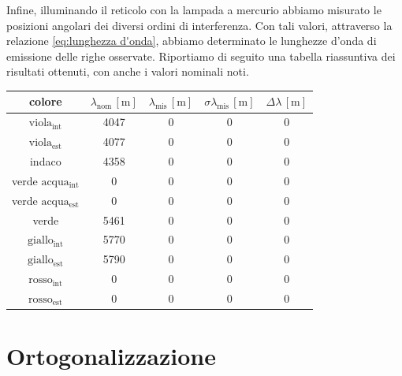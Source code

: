 \documentclass{article}
\begin{document}
        Infine, illuminando il reticolo con la lampada a mercurio abbiamo misurato le posizioni angolari dei diversi ordini di interferenza. 
        Con tali valori, attraverso la relazione \ref{eq:lunghezza d'onda}, abbiamo determinato le lunghezze d'onda di emissione delle righe osservate. 
        Riportiamo di seguito una tabella riassuntiva dei risultati ottenuti, con anche i valori nominali noti. \\  

        \begin{table}[H]
            \centering
            \begin{tabular}{|c|c|c|c|c|}
                \toprule 
                colore & 
                $ \lambda_{\mathrm{nom}} \, \mathrm{[m]} $ & 
                $ \lambda_{\mathrm{mis}} \, \mathrm{[m]} $ & 
                $ \sigma \lambda_{\mathrm{mis}} \, \mathrm{[m]}$ & 
                $ \Delta \lambda \, \mathrm{[m]} $ \\

                \midrule
                $ \mathrm{viola_{int}} $        & 4047 & 0 & 0 & 0 \\
                $ \mathrm{viola_{est}} $        & 4077 & 0 & 0 & 0 \\
                indaco                          & 4358 & 0 & 0 & 0 \\
                verde $ \mathrm{acqua_{int}} $  & 0 & 0 & 0 & 0 \\  
                verde $ \mathrm{acqua_{est}} $  & 0 & 0 & 0 & 0 \\
                verde                           & 5461 & 0 & 0 & 0 \\
                $ \mathrm{giallo_{int}} $       & 5770 & 0 & 0 & 0 \\
                $ \mathrm{giallo_{est}} $       & 5790 & 0 & 0 & 0 \\
                $ \mathrm{rosso_{int}} $        & 0 & 0 & 0 & 0 \\
                $ \mathrm{rosso_{est}} $        & 0 & 0 & 0 & 0 \\

                \bottomrule
            \end{tabular}
        \end{table}

        
    \section{Ortogonalizzazione}
\end{document}
